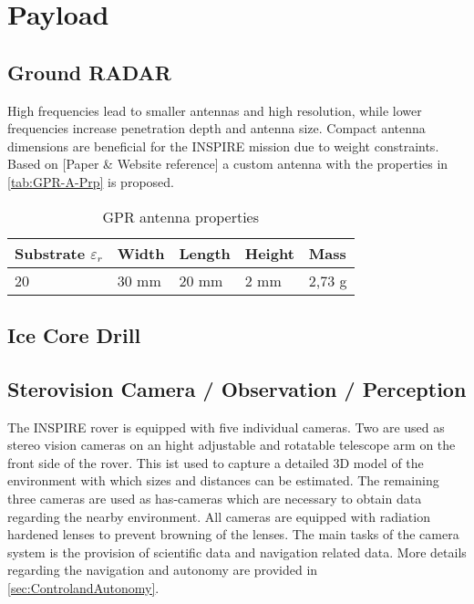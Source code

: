 
\chapter{Payload}
\label{chap:payload}

\section{Ground RADAR}

High frequencies lead to smaller antennas and high resolution, while lower frequencies increase penetration depth and antenna size. 
Compact antenna dimensions are beneficial for the INSPIRE mission due to weight constraints. Based on [Paper \& Website reference] a custom antenna with the properties in \autoref{tab:GPR-A-Prp} is proposed.

\begin{table}[h]
\centering
\begin{tabular}{lllll}
Substrate ${\varepsilon}_{r}$ & Width & Length & Height & Mass   \\ \hline\hline
20                         & 30 mm & 20 mm  & 2 mm   & 2,73 g  \\ \hline
\end{tabular}
\caption{GPR antenna properties}
\label{tab:GPR-A-Prp}
\end{table}

\section{Ice Core Drill}

\section{Sterovision Camera / Observation / Perception}

The INSPIRE rover is equipped with five individual cameras. Two are used as stereo vision cameras on an hight adjustable and rotatable telescope arm on the front side of the rover. This ist used to capture a detailed 3D model of the environment with which sizes and distances can be estimated. The remaining three cameras are used as has-cameras which are necessary to obtain data regarding the nearby environment. All cameras are equipped with radiation hardened lenses to prevent browning of the lenses. The main tasks of the camera system is the provision of scientific data and navigation related data. More details regarding the navigation and autonomy are provided in \autoref{sec:ControlandAutonomy}.

